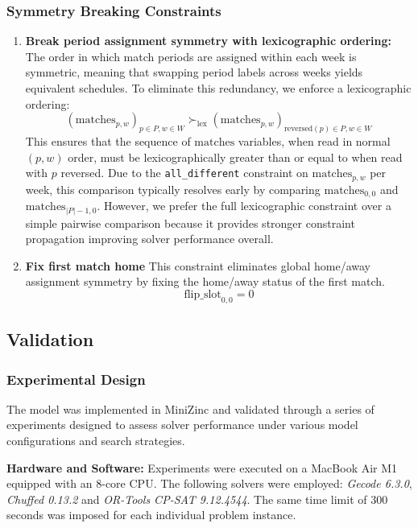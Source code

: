 \subsubsection{Symmetry Breaking Constraints}

\begin{enumerate}
\item \textbf{Break period assignment symmetry with lexicographic ordering:}
The order in which match periods are assigned within each week is symmetric, meaning that swapping period labels across weeks yields equivalent schedules. To eliminate this redundancy, we enforce a lexicographic ordering:
$$
(\text{matches}_{p, w})_{p \in P, w \in W} \succ_{\text{lex}} (\text{matches}_{p, w})_{\text{reversed}(p) \in P, w \in W}
$$
This ensures that the sequence of $\text{matches}$ variables, when read in normal $(p,w)$ order, must be lexicographically greater than or equal to when read with $p$ reversed. Due to the \texttt{all\_different} constraint on $\text{matches}_{p,w}$ per week, this comparison typically resolves early by comparing $\text{matches}_{0,0}$ and $\text{matches}_{|P| - 1,0}$. However, we prefer the full lexicographic constraint over a simple pairwise comparison because it provides stronger constraint propagation improving solver performance overall.

    \item \textbf{Fix first match home} This constraint eliminates global home/away assignment symmetry by fixing the home/away status of the first match.
    \[ \text{flip\_slot}_{0, 0} = 0 \]


\end{enumerate}

\subsection{Validation}

\subsubsection{Experimental Design}

The model was implemented in MiniZinc and validated through a series of experiments designed to assess solver performance under various model configurations and search strategies.

\textbf{Hardware and Software:}
Experiments were executed on a MacBook Air M1 equipped with an 8-core CPU. The following solvers were employed: \textit{Gecode 6.3.0}, \textit{Chuffed 0.13.2} and \textit{OR-Tools CP-SAT 9.12.4544}. 
The same time limit of $300$ seconds was imposed for each individual problem instance.

